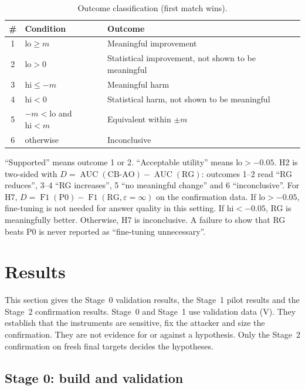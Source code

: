 \documentclass[11pt]{article}
\newcommand{\AUC}{\operatorname{AUC}}
\newcommand{\Fone}{\operatorname{F1}}
\begin{document}
\begin{table}[htbp]
\centering
\caption{Outcome classification (first match wins).}\label{tab:outcomes}
\begin{tabular}{@{}cll@{}}
\toprule
\# & Condition & Outcome \\
\midrule
1 & $\mathrm{lo}\geq m$ & Meaningful improvement \\
2 & $\mathrm{lo}>0$ & Statistical improvement, not shown to be meaningful \\
3 & $\mathrm{hi}\leq -m$ & Meaningful harm \\
4 & $\mathrm{hi}<0$ & Statistical harm, not shown to be meaningful \\
5 & $-m<\mathrm{lo}$ and $\mathrm{hi}<m$ & Equivalent within $\pm m$ \\
6 & otherwise & Inconclusive \\
\bottomrule
\end{tabular}
\end{table}

``Supported'' means outcome 1 or 2. ``Acceptable utility'' means $\mathrm{lo}>-0.05$. H2 is two-sided with $D=\AUC(\text{CB-AO})-\AUC(\text{RG})$: outcomes 1--2 read ``RG reduces'', 3--4 ``RG increases'', 5 ``no meaningful change'' and 6 ``inconclusive''. For H7, $D=\Fone(\text{P0})-\Fone(\text{RG},\varepsilon=\infty)$ on the confirmation data. If $\mathrm{lo}>-0.05$, fine-tuning is not needed for answer quality in this setting. If $\mathrm{hi}<-0.05$, RG is meaningfully better. Otherwise, H7 is inconclusive. A failure to show that RG beats P0 is never reported as ``fine-tuning unnecessary''.

\section{Results}\label{sec:results}

This section gives the Stage~0 validation results, the Stage~1 pilot results and the Stage~2 confirmation results. Stage~0 and Stage~1 use validation data (V). They establish that the instruments are sensitive, fix the attacker and size the confirmation. They are not evidence for or against a hypothesis. Only the Stage~2 confirmation on fresh final targets decides the hypotheses.

\subsection{Stage 0: build and validation}\label{sec:res-stage0}
\end{document}
